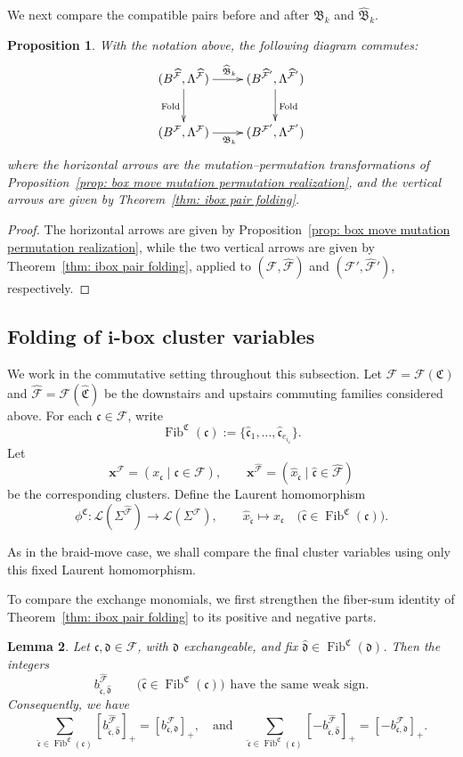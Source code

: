 \documentclass[12pt, leqno]{amsart}
\numberwithin{equation}{section}
\theoremstyle{plain}
\newtheorem{lemma}{Lemma}[section]
\newtheorem{proposition}[lemma]{Proposition}
\theoremstyle{definition}
\newcommand{\seteq}{\mathbin{:=}}
\newcommand{\Fib}{\operatorname{Fib}}
\newcommand{\hx}{\widehat{x}}
\newcommand{\frakB}{\mathfrak{B}}
\newcommand{\frakC}{\mathfrak{C}}
\newcommand{\frakc}{\mathfrak{c}}
\newcommand{\frakd}{\mathfrak{d}}
\newcommand{\hfrakC}{\widehat{\frakC}}
\newcommand{\hfrakc}{\widehat{\frakc}}
\newcommand{\hfrakd}{\widehat{\frakd}}
\newcommand{\bfi}{\mathbf{i}}
\newcommand{\bfx}{\mathbf{x}}
\newcommand{\calF}{\mathcal{F}}
\newcommand{\calL}{\mathcal{L}}
\newcommand{\hcalF}{{\widehat{\calF}}}
\newcommand{\hfrakB}{\widehat{\frakB}}
\newcommand{\qtq}[1][{and}]{\quad\text{{#1}}\quad}
\begin{document}
We next compare the compatible pairs  before and after $\frakB_k$ and $\hfrakB_k$. \par
\begin{proposition}\label{prop: ibox endpoint compatible pair folding}
With the notation above, the following diagram commutes:
\[
\xymatrix{
(B^\hcalF,\Lambda^\hcalF) \ar[r]^{\hfrakB_k} \ar[d]_{\operatorname{Fold}} & (B^{\hcalF'},\Lambda^{\hcalF'}) \ar[d]^{\operatorname{Fold}}
\\
(B^\calF,\Lambda^\calF) \ar[r]_{\frakB_k} & (B^{\calF'},\Lambda^{\calF'})
}
\]
where the horizontal arrows are the mutation--permutation
transformations of
Proposition~\ref{prop: box move mutation permutation realization},
and the vertical arrows are given by
Theorem~\ref{thm: ibox pair folding}.
\end{proposition}

\begin{proof}
The horizontal arrows are given by
Proposition~\ref{prop: box move mutation permutation realization},
 while the two vertical arrows are given by{}
Theorem~\ref{thm: ibox pair folding}, applied to
$(\calF,\hcalF)$ and $(\calF',\hcalF')$, respectively.
\end{proof}

\subsection{Folding of $\bfi$-box cluster variables}

We work in the commutative setting throughout this subsection.
Let $\calF=\calF(\frakC)$ and $\hcalF=\calF(\hfrakC)$ be the 
downstairs and upstairs commuting families considered
above. For each $\frakc\in\calF$, write
\[
\Fib^{\frakC}(\frakc)
\seteq
\{\hfrakc_1,\ldots,\hfrakc_{e_{i_\frakc}}\}.
\]
Let
\[
\bfx^\calF=(x_\frakc\mid \frakc\in\calF), \qquad \bfx^\hcalF=(\hx_{\hfrakc}\mid \hfrakc\in\hcalF)
\]
be the corresponding clusters. Define  the Laurent homomorphism
\[
\phi^\frakC: \calL(\Sigma^\hcalF) \longrightarrow \calL(\Sigma^\calF), \qquad \hx_{\hfrakc}\longmapsto x_\frakc
\quad \bigl(\hfrakc\in\Fib^{\frakC}(\frakc)\bigr).
\]

As in the braid-move case, we shall compare the final cluster
variables using only  this fixed Laurent homomorphism. 

To compare the exchange monomials, we first strengthen the
fiber-sum identity of Theorem~\ref{thm: ibox pair folding} to
its positive and negative parts.

\begin{lemma}\label{lem: ibox weak sign}
Let $\frakc,\frakd\in\calF$, with $\frakd$ exchangeable, and fix
$\hfrakd\in\Fib^{\frakC}(\frakd)$. Then the integers
\[
b^\hcalF_{\hfrakc,\hfrakd} \qquad \bigl(\hfrakc\in\Fib^{\frakC}(\frakc)\bigr) \ \ \text{have the same weak sign.}
\]
 Consequently, we have
\[
\sum_{\hfrakc\in\Fib^{\frakC}(\frakc)} [b^\hcalF_{\hfrakc,\hfrakd}]_+  = [b^\calF_{\frakc,\frakd}]_+,
\qtq
\sum_{\hfrakc\in\Fib^{\frakC}(\frakc)} [-b^\hcalF_{\hfrakc,\hfrakd}]_+ = [-b^\calF_{\frakc,\frakd}]_+.
\]
\end{lemma}
\end{document}
